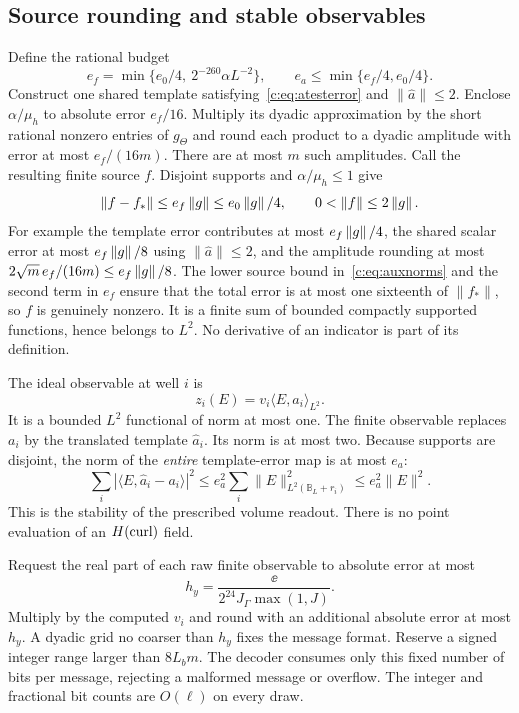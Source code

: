 \subsection{Source rounding and stable observables}
Define the rational budget
\begin{equation}
 e_f=\min\{e_0/4,\ 2^{-260}\alpha L^{-2}\},
 \qquad
 e_a\le\min\{e_f/4,e_0/4\}.                 \label{c:eq:sourcebudgets}
\end{equation}
Construct one shared template satisfying~\eqref{c:eq:atesterror} and
$\|\widehat a\|\le2$. Enclose $\alpha/\mu_h$ to absolute error
$e_f/16$. Multiply its dyadic approximation by the short rational
nonzero entries of $g_\Theta$ and round each product to a dyadic amplitude
with error at most $e_f/(16m)$. There are at most $m$ such amplitudes.
Call the resulting finite source $f$. Disjoint supports and
$\alpha/\mu_h\le1$ give
\begin{equation}
 \|f-f_*\|\le e_f \left\lVert g\right\rVert\le e_0\left\lVert g\right\rVert/4,
 \qquad 0<\|f\|\le2\left\lVert g\right\rVert.                              \label{c:eq:finite-source-error}
\end{equation}
For example the template error contributes at most $e_f\left\lVert g\right\rVert/4$, the
shared scalar error at most $e_f\left\lVert g\right\rVert/8$ using $\|\widehat a\|\le2$,
and the amplitude rounding at most
$2\sqrt m\,e_f/(16m)\le e_f\left\lVert g\right\rVert/8$.
The lower source bound in~\eqref{c:eq:auxnorms} and the second term
in $e_f$ ensure that the total error is at most one sixteenth of
$\|f_*\|$, so $f$ is genuinely nonzero. It is a finite sum of
bounded compactly supported functions, hence belongs to $L^2$.
No derivative of an indicator is part of its definition.

The ideal observable at well $i$ is
\begin{equation}
 z_i(E)=v_i\langle E,a_i\rangle_{L^2}.
                                                               \label{c:eq:idealreadout}
\end{equation}
It is a bounded $L^2$ functional of norm at most one. The finite
observable replaces $a_i$ by the translated template $\widehat a_i$.
Its norm is at most two. Because supports are disjoint, the norm
of the \emph{entire} template-error map is at most $e_a$:
\[
 \sum_i|\langle E,\widehat a_i-a_i\rangle|^2
 \le e_a^2\sum_i\|E\|_{L^2(\mathbb B_L+r_i)}^2
 \le e_a^2\|E\|^2.
\]
This is the stability of the prescribed volume readout. There is
no point evaluation of an $H(\operatorname{curl})$ field.

Request the real part of each raw finite observable to absolute
error at most
\begin{equation}
 h_y=\frac{\ee}{2^{24}J_\Gamma\max(1,J)}.            \label{c:eq:momentaccuracy}
\end{equation}
Multiply by the computed $v_i$ and round with an additional absolute
error at most $h_y$. A dyadic grid no coarser than $h_y$ fixes the
message format. Reserve a signed integer range larger than $8L_bm$.
The decoder consumes only this fixed number of bits per message,
rejecting a malformed message or overflow. The integer and fractional
bit counts are $O(\ell)$ on every draw.


